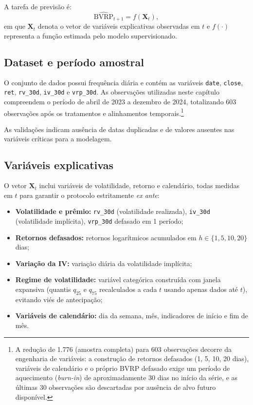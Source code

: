 A tarefa de previsão é:
\begin{equation}
\widehat{\text{BVRP}}_{t+1} = f\!\left(\mathbf{X}_t\right),
\end{equation}
em que $\mathbf{X}_t$ denota o vetor de variáveis explicativas observadas em $t$
e $f(\cdot)$ representa a função estimada pelo modelo supervisionado.

\subsection{Dataset e período amostral}
\label{subsec:cap5_dataset}

O conjunto de dados possui frequência diária e contém as variáveis
\texttt{date}, \texttt{close}, \texttt{ret}, \texttt{rv\_30d}, \texttt{iv\_30d}
e \texttt{vrp\_30d}. As observações utilizadas neste capítulo compreendem o período
de abril de 2023 a dezembro de 2024, totalizando 603 observações após os tratamentos
e alinhamentos temporais.\footnote{A redução de 1.776 (amostra completa) para 603
observações decorre da engenharia de variáveis: a construção de retornos defasados
(1, 5, 10, 20 dias), variáveis de calendário e o próprio BVRP defasado exige um
período de aquecimento (\textit{burn-in}) de aproximadamente 30 dias no início da
série, e as últimas 30 observações são descartadas por ausência de alvo futuro disponível.}

As validações indicam ausência de datas duplicadas e de valores ausentes nas
variáveis críticas para a modelagem.

\subsection{Variáveis explicativas}
\label{subsec:cap5_features}

O vetor $\mathbf{X}_t$ inclui variáveis de volatilidade, retorno e calendário,
todas medidas em $t$ para garantir o protocolo estritamente \textit{ex ante}:

\begin{itemize}
    \item \textbf{Volatilidade e prêmio:} \texttt{rv\_30d} (volatilidade realizada),
    \texttt{iv\_30d} (volatilidade implícita), \texttt{vrp\_30d} defasado em 1 período;
    \item \textbf{Retornos defasados:} retornos logarítmicos acumulados em $h \in \{1, 5, 10, 20\}$ dias;
    \item \textbf{Variação da IV:} variação diária da volatilidade implícita;
    \item \textbf{Regime de volatilidade:} variável categórica construída com janela
    expansiva (quantis $q_{25}$ e $q_{75}$ recalculados a cada $t$ usando apenas
    dados até $t$), evitando viés de antecipação;
    \item \textbf{Variáveis de calendário:} dia da semana, mês, indicadores de início
    e fim de mês.
\end{itemize}

